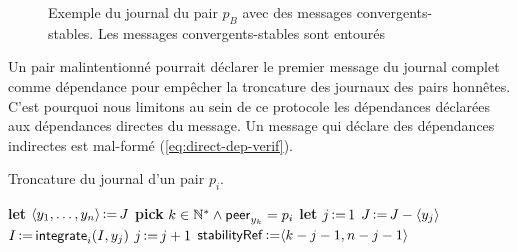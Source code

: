 \begin{figure}[hbt]
\centering
{}
\caption[Journal d'un pair $p_B$ avec des messages convergents-stables]{Exemple du journal du pair $p_B$ avec des messages convergents-stables.
Les messages convergents-stables sont entourés}\label{fig:log-stability-example-b}
\end{figure}

Un pair malintentionné pourrait déclarer le premier message du journal complet comme dépendance pour empêcher la troncature des journaux des pairs honnêtes.
C'est pourquoi nous limitons au sein de ce protocole les dépendances déclarées aux dépendances directes du message.
Un message qui déclare des dépendances indirectes est mal-formé (\autoref{eq:direct-dep-verif}).

\begin{algorithm}[ht]
\caption{Troncature du journal d'un pair $p_i$.}\label{alg:log-truncation}
\begin{algorithmic}[1]
    \State \textbf{let} $\tuple*{y_1, \dotsc, y_n} \assign J$
    \State \textbf{pick} $k \in \mathbb{N}^* \land \trm{peer}_{y_k} = p_i$
        \State \textbf{let} $j \assign 1$
            \State $J \assign J \sminus \tuple*{y_j}$ 
            \State $I \assign \trm{integrate}_i(I, y_j)$ 
            \State $j \assign j + 1$ 
        \EndWhile
        \State $\trm{stabilityRef} \assign \tuple*{k - j - 1, n - j - 1}$ 
    \EndIf
\EndProcedure
\end{algorithmic}
\end{algorithm}


